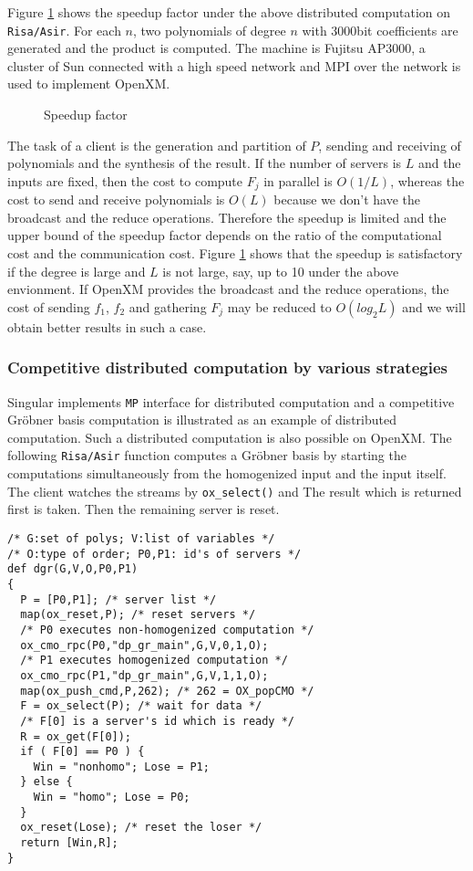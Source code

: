 Figure \ref{speedup}
shows the speedup factor under the above distributed computation
on {\tt Risa/Asir}. For each $n$, two polynomials of degree $n$
with 3000bit coefficients are generated and the product is computed.
The machine is Fujitsu AP3000,
a cluster of Sun connected with a high speed network and MPI over the
network is used to implement OpenXM.
\begin{figure}[htbp]
\epsfxsize=8.5cm
\caption{Speedup factor}
\label{speedup}
\end{figure}

The task of a client is the generation and partition of $P$, sending
and receiving of polynomials and the synthesis of the result. If the
number of servers is $L$ and the inputs are fixed, then the cost to
compute $F_j$ in parallel is $O(1/L)$, whereas the cost
to send and receive polynomials is $O(L)$
because we don't have the broadcast and the reduce
operations. Therefore the speedup is limited and the upper bound of
the speedup factor depends on the ratio of 
the computational cost and the communication cost.
Figure \ref{speedup} shows that 
the speedup is satisfactory if the degree is large and $L$
is not large, say, up to 10 under the above envionment.
If OpenXM provides the broadcast and the reduce operations, the cost of 
sending $f_1$, $f_2$ and gathering $F_j$ may be reduced to $O(log_2L)$
and we will obtain better results in such a case.

\subsubsection{Competitive distributed computation by various strategies}

Singular \cite{Singular} implements {\tt MP} interface for distributed
computation and a competitive Gr\"obner basis computation is
illustrated as an example of distributed computation.
Such a distributed computation is also possible on OpenXM.
The following {\tt Risa/Asir} function computes a Gr\"obner basis by
starting the computations simultaneously from the homogenized input and
the input itself.  The client watches the streams by {\tt ox\_select()}
and The result which is returned first is taken. Then the remaining
server is reset.

\begin{verbatim}
/* G:set of polys; V:list of variables */
/* O:type of order; P0,P1: id's of servers */
def dgr(G,V,O,P0,P1)
{
  P = [P0,P1]; /* server list */
  map(ox_reset,P); /* reset servers */
  /* P0 executes non-homogenized computation */
  ox_cmo_rpc(P0,"dp_gr_main",G,V,0,1,O);
  /* P1 executes homogenized computation */
  ox_cmo_rpc(P1,"dp_gr_main",G,V,1,1,O);
  map(ox_push_cmd,P,262); /* 262 = OX_popCMO */
  F = ox_select(P); /* wait for data */
  /* F[0] is a server's id which is ready */
  R = ox_get(F[0]);
  if ( F[0] == P0 ) {
    Win = "nonhomo"; Lose = P1;
  } else {
    Win = "homo"; Lose = P0;
  }
  ox_reset(Lose); /* reset the loser */
  return [Win,R];
}
\end{verbatim}
